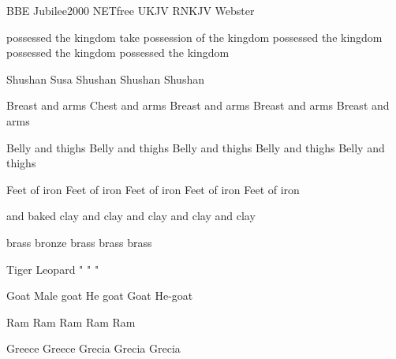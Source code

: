  {BBE} {Jubilee2000} {NETfree} {UKJV} {RNKJV} {Webster} 


      {possessed the kingdom} %
      {take possession of the kingdom} %
      {possessed the kingdom} %
      {possessed the kingdom} %
      {possessed the kingdom} %


      {Shushan} %
      {Susa} %
      {Shushan} %
      {Shushan} %
      {Shushan} %

      {Breast and arms} %
      {Chest and arms} %
      {Breast and arms} %
      {Breast and arms} %
      {Breast and arms} %

      {Belly and thighs} %
      {Belly and thighs} %
      {Belly and thighs} %
      {Belly and thighs} %
      {Belly and thighs} %

      {Feet of iron} %
      {Feet of iron} %
      {Feet of iron} %
      {Feet of iron} %
      {Feet of iron} %


      {and baked clay} %
      { and clay} %
      { and clay} %
      { and clay} %
      { and clay} %

      {brass} %
      {bronze} %
      {brass} %
      {brass} %
      {brass} %


      {Tiger} %
      {Leopard} %
      {"} %
      {"} %
      {"} %


      {Goat} %
      {Male goat} %
      {He goat} %
      {Goat} %
      {He-goat} %


      {Ram} %
      {Ram} %
      {Ram} %
      {Ram} %
      {Ram} %

      {Greece} %
      {Greece} %
      {Grecia} %
      {Grecia} %
      {Grecia} %


\vdef {} %
      {} %
      {} %
      {} %
      {} %
      {} %

